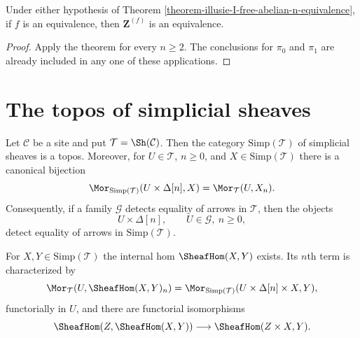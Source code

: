\begin{corollary}
\label{corollary-illusie-I-free-abelian-equivalence}
Under either hypothesis of Theorem
\ref{theorem-illusie-I-free-abelian-n-equivalence}, if $f$ is an
equivalence, then $\mathbf{Z}^{(f)}$ is an equivalence.
\end{corollary}

\begin{proof}
Apply the theorem for every $n \geq 2$. The conclusions for $\pi_0$ and
$\pi_1$ are already included in any one of these applications.
\end{proof}


\section{The topos of simplicial sheaves}
\label{section-illusie-I-simplicial-topos}

\begin{lemma}
\label{lemma-illusie-I-simplicial-sheaves-topos}
Let $\mathcal{C}$ be a site and put $\mathcal{T} = \Sh(\mathcal{C})$.
Then the category $\text{Simp}(\mathcal{T})$ of simplicial sheaves is a
topos.  Moreover, for $U \in \mathcal{T}$, $n \geq 0$, and
$X \in \text{Simp}(\mathcal{T})$ there is a canonical bijection
$$
\Mor_{\text{Simp}(\mathcal{T})}(U \times \Delta[n], X)
=
\Mor_{\mathcal{T}}(U, X_n).
$$
Consequently, if a family $\mathcal{G}$ detects equality of arrows in
$\mathcal{T}$, then the objects
$$
U \times \Delta[n], \qquad U \in \mathcal{G},\ n \geq 0,
$$
detect equality of arrows in $\text{Simp}(\mathcal{T})$.

For $X,Y \in \text{Simp}(\mathcal{T})$ the internal hom
$\SheafHom(X,Y)$ exists.  Its $n$th term is characterized by
$$
\Mor_{\mathcal{T}}(U,\SheafHom(X,Y)_n)
=
\Mor_{\text{Simp}(\mathcal{T})}
(U \times \Delta[n] \times X,Y),
$$
functorially in $U$, and there are functorial isomorphisms
$$
\SheafHom(Z,\SheafHom(X,Y))
\longrightarrow
\SheafHom(Z \times X,Y).
$$
\end{lemma}

